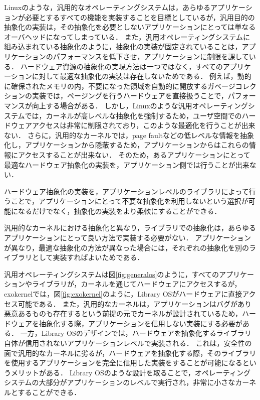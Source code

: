 \documentclass[graduation-thesis]{mlarticle}
\begin{document}
Linuxのような，汎用的なオペレーティングシステムは，あらゆるアプリケーションが必要とするすべての機能を実装することを目標としているが，汎用目的の抽象化の実装は，その抽象化を必要としないアプリケーションにとっては単なるオーバヘッドになってしまっている．
また，汎用オペレーティングシステムに組み込まれている抽象化のように，抽象化の実装が固定されていることは，アプリケーションのパフォーマンスを低下させ，アプリケーションに制限を課している．
ハードウェア資源の抽象化の実現方法は一つではなく，すべてのアプリケーションに対して最適な抽象化の実装は存在しないためである．
例えば，動的に確保されたメモリの内，不要になった領域を自動的に開放するガベージコレクションの実装では，ページングを行うハードウェアを直接扱うことで，パフォーマンスが向上する場合がある．
しかし，Linuxのような汎用オペレーティングシステムでは，カーネルが高レベルな抽象化を強制するため，ユーザ空間でのハードウェアアクセスは非常に制限されており，このような最適化を行うことが出来ない．
さらに，汎用的なカーネルでは，page faultなどの低レベルな情報を抽象化し，アプリケーションから隠蔽するため，アプリケーションからはこれらの情報にアクセスすることが出来ない．
そのため，あるアプリケーションにとって最適なハードウェア抽象化の実装を，アプリケーション側では行うことが出来ない．

ハードウェア抽象化の実装を，アプリケーションレベルのライブラリによって行うことで，アプリケーションにとって不要な抽象化を利用しないという選択が可能になるだけでなく，抽象化の実装をより柔軟にすることができる．

汎用的なカーネルにおける抽象化と異なり，ライブラリでの抽象化は，あらゆるアプリケーションにとって良い方法で実装する必要がない．
アプリケーションが異なり，最適な抽象化の方法が異なった場合には，それぞれの抽象化を別のライブラリとして実装すればよいためである．

汎用オペレーティングシステムは図\ref{fig:generalos}のように，すべてのアプリケーションやライブラリが，カーネルを通じてハードウェアにアクセスするが，exokernelでは，図\ref{fig:exokernel}のように，Library OSがハードウェアに直接アクセス可能である．
また，汎用的なカーネルは，アプリケーションはバグがあり悪意あるものも存在するという前提の元でカーネルが設計されているため，ハードウェアを抽象化する際，アプリケーションを信用しない実装にする必要がある．
一方，Library OSのデザインでは，ハードウェアを抽象化するライブラリ自体が信用されないアプリケーションレベルで実装される．
これは，安全性の面で汎用的なカーネルに劣るが，ハードウェアを抽象化する際，そのライブラリを使用するアプリケーションを完全に信用した実装をすることが可能になるというメリットがある．
Library OSのような設計を取ることで，オペレーティングシステムの大部分がアプリケーションのレベルで実行され，非常に小さなカーネルとすることができる．
\end{document}
